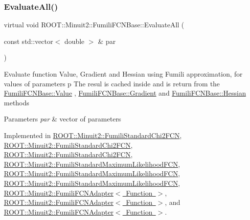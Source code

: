 \subsubsection{\texorpdfstring{EvaluateAll()}{EvaluateAll()}\hspace{0.1cm}{\footnotesize\ttfamily [1/3]}}
{\footnotesize\ttfamily virtual void R\+O\+O\+T\+::\+Minuit2\+::\+Fumili\+F\+C\+N\+Base\+::\+Evaluate\+All (\begin{DoxyParamCaption}\item[{const std\+::vector$<$ double $>$ \&}]{par }\end{DoxyParamCaption})\hspace{0.3cm}{\ttfamily [pure virtual]}}

Evaluate function Value, Gradient and Hessian using Fumili approximation, for values of parameters p The resul is cached inside and is return from the \mbox{\hyperlink{classROOT_1_1Minuit2_1_1FumiliFCNBase_a221dacee0ccde747a271a0cecd759f98}{Fumili\+F\+C\+N\+Base\+::\+Value}} , \mbox{\hyperlink{classROOT_1_1Minuit2_1_1FumiliFCNBase_ad226939ea2e83f754b5a6afc30876d3e}{Fumili\+F\+C\+N\+Base\+::\+Gradient}} and \mbox{\hyperlink{classROOT_1_1Minuit2_1_1FumiliFCNBase_ade134d8c6613393e942ef98d445db376}{Fumili\+F\+C\+N\+Base\+::\+Hessian}} methods


\begin{DoxyParams}{Parameters}
{\em par} & vector of parameters \\
\hline
\end{DoxyParams}


Implemented in \mbox{\hyperlink{classROOT_1_1Minuit2_1_1FumiliStandardChi2FCN_a76f42b6e5d2a92961a9fd8feca38b582}{R\+O\+O\+T\+::\+Minuit2\+::\+Fumili\+Standard\+Chi2\+F\+CN}}, \mbox{\hyperlink{classROOT_1_1Minuit2_1_1FumiliStandardChi2FCN_ace15dd1aad435e460c523bc37bff12a8}{R\+O\+O\+T\+::\+Minuit2\+::\+Fumili\+Standard\+Chi2\+F\+CN}}, \mbox{\hyperlink{classROOT_1_1Minuit2_1_1FumiliStandardChi2FCN_ace15dd1aad435e460c523bc37bff12a8}{R\+O\+O\+T\+::\+Minuit2\+::\+Fumili\+Standard\+Chi2\+F\+CN}}, \mbox{\hyperlink{classROOT_1_1Minuit2_1_1FumiliStandardMaximumLikelihoodFCN_a1faea776f7da3c238e522748b573caab}{R\+O\+O\+T\+::\+Minuit2\+::\+Fumili\+Standard\+Maximum\+Likelihood\+F\+CN}}, \mbox{\hyperlink{classROOT_1_1Minuit2_1_1FumiliStandardMaximumLikelihoodFCN_a37e72fc87092e5699066098fa5a31235}{R\+O\+O\+T\+::\+Minuit2\+::\+Fumili\+Standard\+Maximum\+Likelihood\+F\+CN}}, \mbox{\hyperlink{classROOT_1_1Minuit2_1_1FumiliStandardMaximumLikelihoodFCN_a37e72fc87092e5699066098fa5a31235}{R\+O\+O\+T\+::\+Minuit2\+::\+Fumili\+Standard\+Maximum\+Likelihood\+F\+CN}}, \mbox{\hyperlink{classROOT_1_1Minuit2_1_1FumiliFCNAdapter_a75bacae09c510900a45ea753afae971a}{R\+O\+O\+T\+::\+Minuit2\+::\+Fumili\+F\+C\+N\+Adapter$<$ Function $>$}}, \mbox{\hyperlink{classROOT_1_1Minuit2_1_1FumiliFCNAdapter_a75bacae09c510900a45ea753afae971a}{R\+O\+O\+T\+::\+Minuit2\+::\+Fumili\+F\+C\+N\+Adapter$<$ Function $>$}}, and \mbox{\hyperlink{classROOT_1_1Minuit2_1_1FumiliFCNAdapter_a75bacae09c510900a45ea753afae971a}{R\+O\+O\+T\+::\+Minuit2\+::\+Fumili\+F\+C\+N\+Adapter$<$ Function $>$}}.

